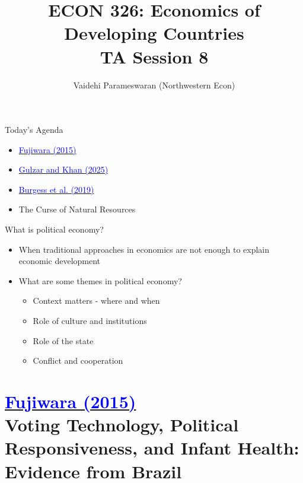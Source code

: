 \documentclass[11pt,notes=hide,aspectratio=169,mathserif]{beamer}
\title[class]{ECON 326: Economics of Developing Countries \\ TA Session 8}
\author[vaidehi's class ]{Vaidehi Parameswaran (Northwestern Econ)}
\date{\monthname[\the\month] \the\year}
\begin{document}
\begin{frame}[plain]
\titlepage
\end{frame}


\begin{frame}{Today's Agenda}

\begin{itemize}
\item \href{https://onlinelibrary-wiley-com.turing.library.northwestern.edu/doi/epdf/10.3982/ECTA18916}{\textcolor{blue}{Fujiwara (2015)}}
\item \href{https://academic.oup.com/restud/article/92/1/339/7627149}{\textcolor{blue}{Gulzar and Khan (2025)}}
\item \href{https://www.lse.ac.uk/economics/Assets/Documents/personal-pages/robin-burgess/the-brazilian-amazons-double-reversal-of-fortune-manuscript.pdf}{\textcolor{blue}{Burgess et al. (2019)}}
\item The Curse of Natural Resources
\end{itemize}
\end{frame}

\begin{frame}{What is political economy?}

\begin{itemize}
\item When traditional approaches in economics are not enough to explain economic development
\item What are some themes in political economy?
\begin{itemize}
    \item Context matters - where and when 
    \item Role of culture and institutions
    \item Role of the state
    \item Conflict and cooperation
\end{itemize}
\end{itemize}
\end{frame}

\section*{\href{https://onlinelibrary-wiley-com.turing.library.northwestern.edu/doi/epdf/10.3982/ECTA18916}{\textcolor{blue}{Fujiwara (2015)}} \\[5mm] 
\textnormal{\small{Voting Technology, Political Responsiveness, and Infant Health: Evidence from Brazil}}}
\end{document}
